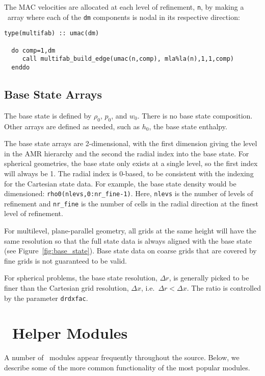 The MAC velocities are allocated at each level of refinement, {\tt n},
by making a \multifab\ array where each of the {\tt dm} components is
nodal in its respective direction:
\begin{lstlisting}[language={[95]fortran},mathescape=false]
  type(multifab) :: umac(dm)

  do comp=1,dm
     call multifab_build_edge(umac(n,comp), mla%la(n),1,1,comp)
  enddo
\end{lstlisting}



\subsection{Base State Arrays}

The base state is defined by $\rho_0$, $p_0$, and $w_0$.  There is no
base state composition.  Other arrays are defined as needed, such as
$h_0$, the base state enthalpy.

The base state arrays are 2-dimensional, with the first dimension
giving the level in the AMR hierarchy and the second the radial index
into the base state.  For spherical geometries, the base state only
exists at a single level, so the first index will always be 1.  The
radial index is 0-based, to be consistent with the indexing for the
Cartesian state data.  For example, the base state density would be
dimensioned: {\tt rho0(nlevs,0:nr\_fine-1)}.  Here, {\tt nlevs} is the
number of levels of refinement and {\tt nr\_fine} is the number of
cells in the radial direction at the finest level of refinement.

For multilevel, plane-parallel geometry, all grids at the same height
will have the same resolution so that the full state data is always
aligned with the base state (see Figure~\ref{fig:base_state}).  Base
state data on coarse grids that are covered by fine grids is not
guaranteed to be valid.

For spherical problems, the base state resolution, $\Delta r$, is
generally picked to be finer than the Cartesian grid resolution,
$\Delta x$, i.e.\ $\Delta r < \Delta x$.  The ratio is controlled
by the parameter {\tt drdxfac}.



\section{\maestro\ Helper Modules}

A number of \maestro\ modules appear frequently throughout the source.
Below, we describe some of the more common functionality of the most
popular modules.

